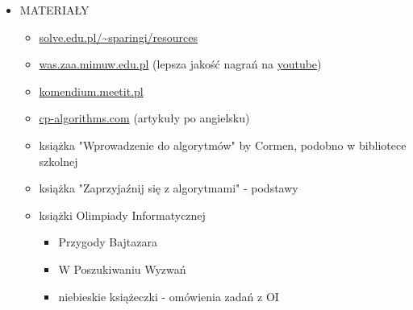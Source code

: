 \documentclass[15pt]{article}
\begin{document}
\begin{itemize}
    \item MATERIAŁY
    \begin{itemize}
        \item \href{http://solve.edu.pl/~sparingi/resources}{solve.edu.pl/\textasciitilde sparingi/resources}
        \item \href{http://was.zaa.mimuw.edu.pl}{was.zaa.mimuw.edu.pl} (lepsza jakość nagrań na \href{https://www.youtube.com/channel/UCZjaIYhRs2wAZn9tPED_yuw}{youtube})
        \item \href{http://kompendium.meetit.pl/kurs}{komendium.meetit.pl}
        \item \href{https://cp-algorithms.com/}{cp-algorithms.com} (artykuły po angielsku)
        \item książka "Wprowadzenie do algorytmów" by Cormen, podobno w bibliotece szkolnej
        \item książka "Zaprzyjaźnij się z algorytmami" - podstawy
        \item książki Olimpiady Informatycznej
        \begin{itemize}
            \item Przygody Bajtazara
            \item W Poszukiwaniu Wyzwań
            \item niebieskie książeczki - omówienia zadań z OI
        \end{itemize}
    \end{itemize}
\end{itemize}
\end{document}
